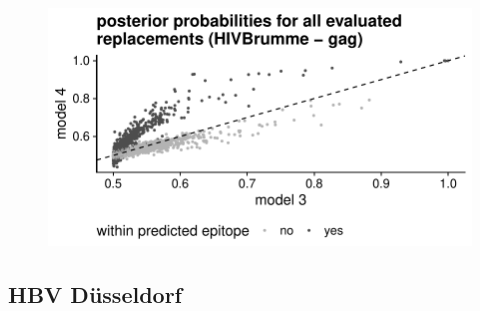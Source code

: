 \documentclass[a4paper,11pt]{article}
\begin{document}
\begin{figure}[H]
    \begin{minipage}{.49\textwidth}
      \includegraphics[width=\linewidth]{plots/posterior_p/hiv_brumme/gag.pdf}
    \end{minipage}
    \begin{minipage}{.49\textwidth}
    \end{minipage}%
  
    \vspace{0.5cm}
  
    \begin{minipage}{.49\textwidth}
    \end{minipage}
    \begin{minipage}{.49\textwidth}
    \end{minipage}
\end{figure}

\subsection*{HBV Düsseldorf}
\end{document}
